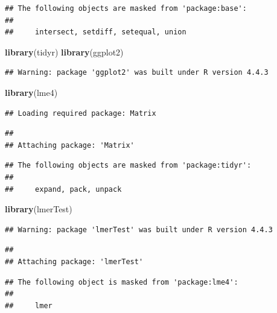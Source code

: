 \documentclass[
]{article}
\newenvironment{Shaded}{\begin{snugshade}}{\end{snugshade}}
\newcommand{\FunctionTok}[1]{\textcolor[rgb]{0.13,0.29,0.53}{\textbf{#1}}}
\newcommand{\NormalTok}[1]{#1}
\begin{document}
\begin{verbatim}
## The following objects are masked from 'package:base':
## 
##     intersect, setdiff, setequal, union
\end{verbatim}

\begin{Shaded}
\begin{Highlighting}[]
\FunctionTok{library}\NormalTok{(tidyr)}
\FunctionTok{library}\NormalTok{(ggplot2)}
\end{Highlighting}
\end{Shaded}

\begin{verbatim}
## Warning: package 'ggplot2' was built under R version 4.4.3
\end{verbatim}

\begin{Shaded}
\begin{Highlighting}[]
\FunctionTok{library}\NormalTok{(lme4)}
\end{Highlighting}
\end{Shaded}

\begin{verbatim}
## Loading required package: Matrix
\end{verbatim}

\begin{verbatim}
## 
## Attaching package: 'Matrix'
\end{verbatim}

\begin{verbatim}
## The following objects are masked from 'package:tidyr':
## 
##     expand, pack, unpack
\end{verbatim}

\begin{Shaded}
\begin{Highlighting}[]
\FunctionTok{library}\NormalTok{(lmerTest)}
\end{Highlighting}
\end{Shaded}

\begin{verbatim}
## Warning: package 'lmerTest' was built under R version 4.4.3
\end{verbatim}

\begin{verbatim}
## 
## Attaching package: 'lmerTest'
\end{verbatim}

\begin{verbatim}
## The following object is masked from 'package:lme4':
## 
##     lmer
\end{verbatim}
\end{document}
